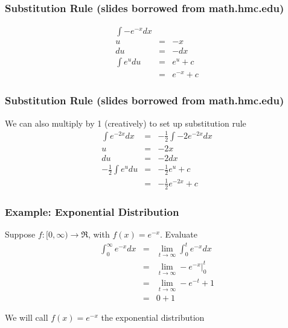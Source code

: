 \documentclass{beamer}
\numberwithin{equation}{section}
\begin{document}
\begin{frame}
\frametitle{Substitution Rule (slides borrowed from math.hmc.edu)}

\begin{eqnarray}
\int - e^{-x} dx && \nonumber \\
u & = & -x \nonumber \\
du & = & - dx \nonumber \\
\int e^{u} du & = & e^{u}  + c \nonumber \\
 				&= & e^{-x}  + c \nonumber 
\end{eqnarray}

\end{frame}

\begin{frame}
\frametitle{Substitution Rule (slides borrowed from math.hmc.edu)}

We can also multiply by 1 (creatively) to set up substitution rule
\begin{eqnarray}
\int e^{-2x}dx  & = & -\frac{1}{2}\int -2 e^{-2x} dx \nonumber \\
	u 				& = & -2 x \nonumber \\
	du 			& = & -2 dx \nonumber \\
	-\frac{1}{2} \int e^{u} du & = & -\frac{1}{2} e^{u} + c \nonumber \\
										& = & -\frac{1}{2} e^{-2x}  + c \nonumber 				
\end{eqnarray}

\end{frame}



\begin{frame}
\frametitle{Example: Exponential Distribution}

Suppose $f:[0,\infty) \rightarrow \Re$, with $f(x) = e^{-x}$.  Evaluate
\begin{eqnarray}
\int_{0}^{\infty} e^{-x} dx& = & \lim_{t\rightarrow \infty} \int_{0}^{t} e^{-x} dx \nonumber \\
								& = & \lim_{t \rightarrow \infty} -  e^{-x} |_{0}^{t} \nonumber \\
								& = & \lim_{t \rightarrow \infty} - e^{-t}  + 1 \nonumber\\
								& = & 0  + 1 \nonumber 								
\end{eqnarray}

We will call $f(x) = e^{-x}$ the \alert{exponential} distribution

\end{frame}
\end{document}
